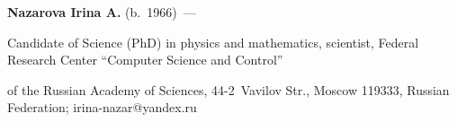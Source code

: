 \vspace*{3pt}





\noindent


\textbf{Nazarova Irina A.} (b.\ 1966)~--- 


Candidate of Science (PhD) in physics and mathematics, scientist, Federal Research Center ``Computer Science and Control'' 


of the Russian Academy of Sciences, 44-2~Vavilov Str., Moscow 119333, Russian Federation; \mbox{irina-nazar@yandex.ru}











 


\label{end\stat}





\renewcommand{\bibname}{\protect\rm Литература} 


